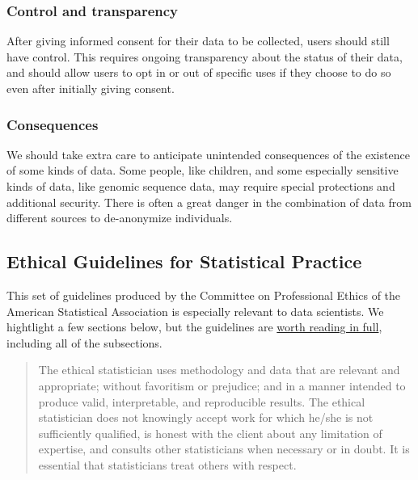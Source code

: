 \documentclass[]{book}
\theoremstyle{definition}
\theoremstyle{definition}
\theoremstyle{definition}
\theoremstyle{remark}
\begin{document}
\subsubsection{Control and transparency}\label{control-and-transparency}

After giving informed consent for their data to be collected, users
should still have control. This requires ongoing transparency about the
status of their data, and should allow users to opt in or out of
specific uses if they choose to do so even after initially giving
consent.

\subsubsection{Consequences}\label{consequences}

We should take extra care to anticipate unintended consequences of the
existence of some kinds of data. Some people, like children, and some
especially sensitive kinds of data, like genomic sequence data, may
require special protections and additional security. There is often a
great danger in the combination of data from different sources to
de-anonymize individuals.

\subsection{Ethical Guidelines for Statistical
Practice}\label{ethical-guidelines-for-statistical-practice}

This set of guidelines produced by the Committee on Professional Ethics
of the American Statistical Association is especially relevant to data
scientists. We hightlight a few sections below, but the guidelines are
\href{https://www.amstat.org/ASA/Your-Career/Ethical-Guidelines-for-Statistical-Practice.aspx}{worth
reading in full}, including all of the subsections.

\begin{quote}
The ethical statistician uses methodology and data that are relevant and
appropriate; without favoritism or prejudice; and in a manner intended
to produce valid, interpretable, and reproducible results. The ethical
statistician does not knowingly accept work for which he/she is not
sufficiently qualified, is honest with the client about any limitation
of expertise, and consults other statisticians when necessary or in
doubt. It is essential that statisticians treat others with respect.
\end{quote}
\end{document}
